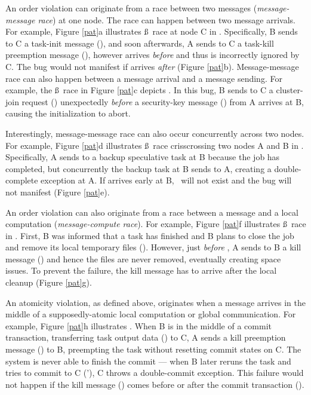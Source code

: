An order violation can originate from a race between two messages
({\em message-message race}) at one node.  The race can happen between
two message arrivals.  For example, Figure \ref{pat}a illustrates
\mac\ss\mbc\ race at node C in .  Specifically, B
sends to C a task-init message (\mbc{}), and soon
afterwards, A sends to C a task-kill preemption
message (\mac{}), however \mac{} arrives {\em before}
\mbc{} and thus is incorrectly ignored by C.  The bug would
not manifest if \mac{} arrives {\em after} \mbc{}
(Figure \ref{pat}b).
%
Message-message race can also happen between a message arrival and a
message sending.  For example, the \mab\ss\mbc\ race in Figure
\ref{pat}c depicts .  In this bug, B sends to
C a cluster-join request (\mbc{}) unexpectedly
{\em before} a security-key message (\mab{}) from A
arrives at B, causing the initialization to abort.

Interestingly, message-message race can also occur concurrently across
two nodes.  For example, Figure \ref{pat}d illustrates
\mab\ss\mba\ race crisscrossing two nodes A and B in
.  Specifically, A sends \mab{} to a backup
speculative task at B because the job has completed, but
concurrently the backup task at B sends \mba{} to A,
creating a double-complete exception at A.  If \mab{} arrives
early at B, \mba\ will not exist and the bug will not manifest (Figure
\ref{pat}e).

An order violation can also originate from a race between a message
and a local computation ({\em message-compute race}).  For example,
Figure \ref{pat}f illustrates \mab\ss\lbp\ race in .  First,
B was informed that a task has finished and B plans to close
the job and remove its local temporary files (\lbp). However, just
{\em before} \lbp, A sends to B a kill message (\mab) and
hence the files are never removed, eventually creating space issues.
To prevent the failure, the kill message has to arrive after the local
cleanup (Figure \ref{pat}g).


An atomicity violation, as defined above, originates when a message
arrives in the middle of a supposedly-atomic local computation or
global communication.
%
For example, Figure \ref{pat}h illustrates .
When B
is in the middle of a commit transaction, transferring task output
data (\mbc) to C,  A sends a kill
preemption message (\mab) to B, preempting the task without resetting
commit states on C.
The system is never able to finish the commit --- when B
later reruns the task and tries to commit to C (\mbc'), C throws a
double-commit exception.  This failure would not happen if the kill
message (\mab) comes before or after the commit transaction
(\mbc).




